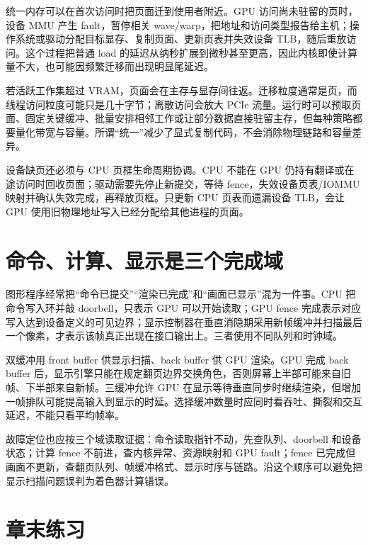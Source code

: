 统一内存可以在首次访问时把页面迁到使用者附近。GPU 访问尚未驻留的页时，设备 MMU 产生 fault，暂停相关 wave/warp，把地址和访问类型报告给主机；操作系统或驱动分配目标显存、复制页面、更新页表并失效设备 TLB，随后重放访问。这个过程把普通 load 的延迟从纳秒扩展到微秒甚至更高，因此内核即使计算量不大，也可能因频繁迁移而出现明显尾延迟。

若活跃工作集超过 VRAM，页面会在主存与显存间往返。迁移粒度通常是页，而线程访问粒度可能只是几十字节；离散访问会放大 PCIe 流量。运行时可以预取页面、固定关键缓冲、批量安排相邻工作或让部分数据直接驻留主存，但每种策略都要量化带宽与容量。所谓“统一”减少了显式复制代码，不会消除物理链路和容量差异。

设备缺页还必须与 CPU 页框生命周期协调。CPU 不能在 GPU 仍持有翻译或在途访问时回收页面；驱动需要先停止新提交，等待 fence，失效设备页表/IOMMU 映射并确认失效完成，再释放页框。只更新 CPU 页表而遗漏设备 TLB，会让 GPU 使用旧物理地址写入已经分配给其他进程的页面。

\section{命令、计算、显示是三个完成域}

图形程序经常把“命令已提交”“渲染已完成”和“画面已显示”混为一件事。CPU 把命令写入环并敲 doorbell，只表示 GPU 可以开始读取；GPU fence 完成表示对应写入达到设备定义的可见边界；显示控制器在垂直消隐期采用新帧缓冲并扫描最后一个像素，才表示该帧真正出现在接口输出上。三者使用不同队列和时钟域。

双缓冲用 front buffer 供显示扫描、back buffer 供 GPU 渲染。GPU 完成 back buffer 后，显示引擎只能在规定翻页边界交换角色，否则屏幕上半部可能来自旧帧、下半部来自新帧。三缓冲允许 GPU 在显示等待垂直同步时继续渲染，但增加一帧排队可能提高输入到显示的时延。选择缓冲数量时应同时看吞吐、撕裂和交互延迟，不能只看平均帧率。

故障定位也应按三个域读取证据：命令读取指针不动，先查队列、doorbell 和设备状态；计算 fence 不前进，查内核异常、资源映射和 GPU fault；fence 已完成但画面不更新，查翻页队列、帧缓冲格式、显示时序与链路。沿这个顺序可以避免把显示扫描问题误判为着色器计算错误。

\section*{章末练习}

